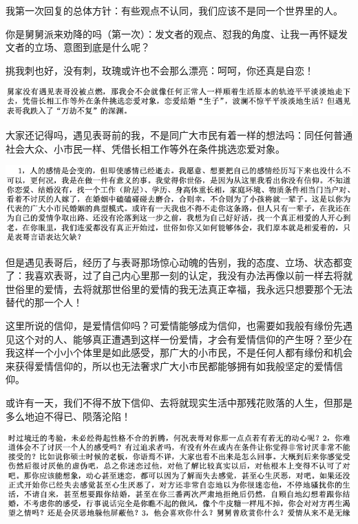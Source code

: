 \documentclass[9pt, b5paper]{article}
\begin{document}
我第一次回复的总体方针：有些观点不认同，我们应该不是同一个世界里的人。

你是舅舅派来劝降的吗（第一次）：发文者的观点、怼我的角度、让我一再怀疑发文者的立场、意图到底是什么呢？

挑我刺也好，没有刺，玫瑰或许也不会那么漂亮：呵呵，你还真是自恋！

\begin{center}
\includegraphics[width=.9\linewidth]{./pic/p1p70.png}
\end{center}

大家还记得吗，遇见表哥前的我，不是同广大市民有着一样的想法吗：同任何普通社会大众、小市民一样、凭借长相工作等外在条件挑选恋爱对象。

\begin{center}
\includegraphics[width=.9\linewidth]{./pic/p1p114-2.png}
\end{center}

但是遇见表哥后，经历了与表哥那场惊心动魄的告别，我的态度、立场、状态都变了：我喜欢表哥，过了自己内心里那一刻的认定，我没有办法再像以前一样去将就世俗里的爱情，去将就那世俗里的爱情的我无法真正幸福，我永远只想要那个无法替代的那一个人！

这里所说的信仰，是爱情信仰吗？可爱情能够成为信仰，也需要如我般有缘份先遇见这个对的人、能够真正遭遇到这样一份爱情，才会有爱情信仰的产生呀？至少在我这样一个小小个体里是如此感受，那广大的小市民，不是任何人都有缘份和机会来获得爱情信仰的，所以也无法奢求广大小市民都能够拥有如我般坚定的爱情信仰。

或许有一天，我们不得不放下信仰、去将就现实生活中那残花败落的人生，但那是多么地迫不得已、陨落沦陷！

\begin{center}
\includegraphics[width=.9\linewidth]{./pic/p1p109-2.png}
\end{center}
\end{document}
